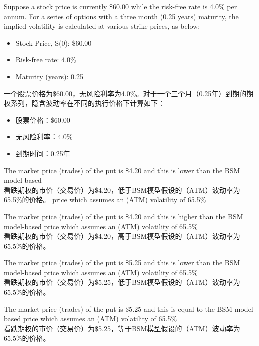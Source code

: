 \documentclass{article}
\newcounter{question} %
\begin{document}
\begin{question}
    Suppose a stock price is currently \$60.00 while the risk-free rate is 4.0\% per annum. For a
    series of options with a three month (0.25 years) maturity, the implied volatility is
    calculated at various strike prices, as below:
    \begin{itemize}
        \item Stock Price, S(0): \$60.00
        \item Risk-free rate: 4.0\%
        \item Maturity (years): 0.25
    \end{itemize}
    一个股票价格为\$60.00，无风险利率为4.0\%。对于一个三个月（0.25年）到期的期权系列，隐含波动率在不同的执行价格下计算如下：
    \begin{itemize}
        \item 股票价格：\$60.00
        \item 无风险利率：4.0\%
        \item 到期时间：0.25年
    \end{itemize}
\end{question}

\begin{choices}
    \item The market price (trades) of the put is \$4.20 and this is lower than the BSM model-based\\
    看跌期权的市价（交易价）为\$4.20，低于BSM模型假设的（ATM）波动率为65.5\%的价格。
    price which assumes an (ATM) volatility of 65.5\%
    \item The market price (trades) of the put is \$4.20 and this is higher than the BSM model-based
    price which assumes an (ATM) volatility of 65.5\%\\
    看跌期权的市价（交易价）为\$4.20，高于BSM模型假设的（ATM）波动率为65.5\%的价格。
    \item The market price (trades) of the put is \$5.25 and this is lower than the BSM model-based
    price which assumes an (ATM) volatility of 65.5\%\\
    看跌期权的市价（交易价）为\$5.25，低于BSM模型假设的（ATM）波动率为65.5\%的价格。
    \item The market price (trades) of the put is \$5.25 and this is equal to the BSM model-based price
    which assumes an (ATM) volatility of 65.5\%\\
    看跌期权的市价（交易价）为\$5.25，等于BSM模型假设的（ATM）波动率为65.5\%的价格。
\end{choices}
\end{document}
